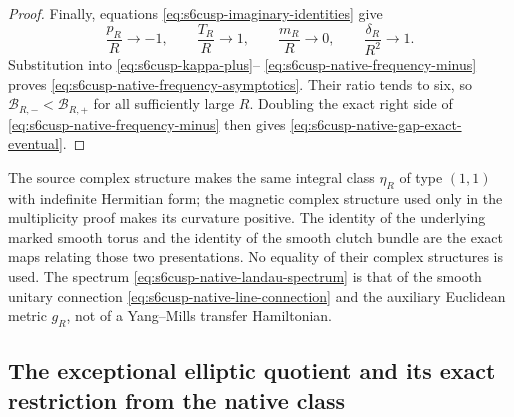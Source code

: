 \begin{proof}
Finally, equations \eqref{eq:s6cusp-imaginary-identities} give
\[
 \frac{p_R}{R}\longrightarrow-1,\qquad
 \frac{T_R}{R}\longrightarrow1,\qquad
 \frac{m_R}{R}\longrightarrow0,\qquad
 \frac{\delta_R}{R^2}\longrightarrow1.
\]
Substitution into \eqref{eq:s6cusp-kappa-plus}--
\eqref{eq:s6cusp-native-frequency-minus} proves
\eqref{eq:s6cusp-native-frequency-asymptotics}.  Their ratio tends to six,
so \(\mathcal B_{R,-}<\mathcal B_{R,+}\) for all sufficiently large
\(R\).  Doubling the exact right side of
\eqref{eq:s6cusp-native-frequency-minus} then gives
\eqref{eq:s6cusp-native-gap-exact-eventual}.
\end{proof}

The source complex structure makes the same integral class \(\eta_R\) of
type \((1,1)\) with indefinite Hermitian form; the magnetic complex
structure used only in the multiplicity proof makes its curvature positive.
The identity of the underlying marked smooth torus and the identity of the
smooth clutch bundle are the exact maps relating those two presentations.
No equality of their complex structures is used.  The spectrum
\eqref{eq:s6cusp-native-landau-spectrum} is that of the smooth unitary
connection \eqref{eq:s6cusp-native-line-connection} and the auxiliary
Euclidean metric \(g_R\), not of a Yang--Mills transfer Hamiltonian.



\subsection{The exceptional elliptic quotient and its exact restriction
from the native class}
\label{subsec:s6cusp-exceptional-elliptic-restriction}

